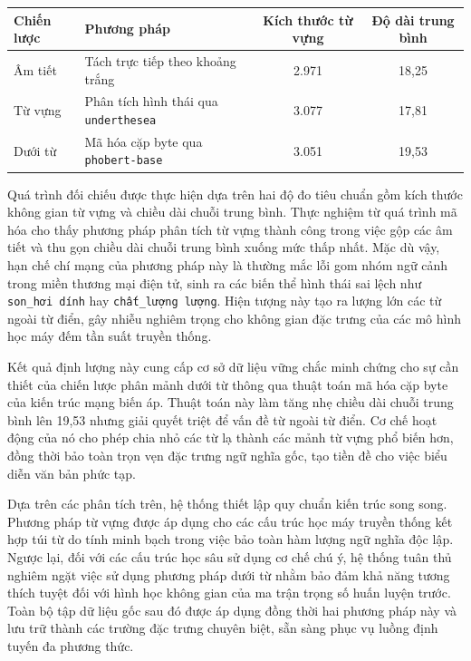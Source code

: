 \begin{center}
\renewcommand{\arraystretch}{1.5}
\noindent\begin{tabularx}{\textwidth}{|>{\raggedright\arraybackslash}p{3.5cm}|>{\raggedright\arraybackslash}X|c|c|}
\hline
\rowcolor[HTML]{E8E8E8}
\textbf{Chiến lược} & \textbf{Phương pháp} & \textbf{Kích thước từ vựng} & \textbf{Độ dài trung bình} \\
\hline
Âm tiết & Tách trực tiếp theo khoảng trắng & 2.971 & 18,25 \\
\hline
Từ vựng & Phân tích hình thái qua \texttt{underthesea} & 3.077 & 17,81 \\
\hline
Dưới từ & Mã hóa cặp byte qua \texttt{phobert-base} & 3.051 & 19,53 \\
\hline
\end{tabularx}
\end{center}

Quá trình đối chiếu được thực hiện dựa trên hai độ đo tiêu chuẩn gồm kích thước không gian từ vựng và chiều dài chuỗi trung bình. Thực nghiệm từ quá trình mã hóa cho thấy phương pháp phân tích từ vựng thành công trong việc gộp các âm tiết và thu gọn chiều dài chuỗi trung bình xuống mức thấp nhất. Mặc dù vậy, hạn chế chí mạng của phương pháp này là thường mắc lỗi gom nhóm ngữ cảnh trong miền thương mại điện tử, sinh ra các biến thể hình thái sai lệch như \texttt{son\_hơi dính} hay \texttt{chất\_lượng lượng}. Hiện tượng này tạo ra lượng lớn các từ ngoài từ điển, gây nhiễu nghiêm trọng cho không gian đặc trưng của các mô hình học máy đếm tần suất truyền thống.

Kết quả định lượng này cung cấp cơ sở dữ liệu vững chắc minh chứng cho sự cần thiết của chiến lược phân mảnh dưới từ thông qua thuật toán mã hóa cặp byte của kiến trúc mạng biến áp. Thuật toán này làm tăng nhẹ chiều dài chuỗi trung bình lên 19,53 nhưng giải quyết triệt để vấn đề từ ngoài từ điển. Cơ chế hoạt động của nó cho phép chia nhỏ các từ lạ thành các mảnh từ vựng phổ biến hơn, đồng thời bảo toàn trọn vẹn đặc trưng ngữ nghĩa gốc, tạo tiền đề cho việc biểu diễn văn bản phức tạp.

Dựa trên các phân tích trên, hệ thống thiết lập quy chuẩn kiến trúc song song. Phương pháp từ vựng được áp dụng cho các cấu trúc học máy truyền thống kết hợp túi từ do tính minh bạch trong việc bảo toàn hàm lượng ngữ nghĩa độc lập. Ngược lại, đối với các cấu trúc học sâu sử dụng cơ chế chú ý, hệ thống tuân thủ nghiêm ngặt việc sử dụng phương pháp dưới từ nhằm bảo đảm khả năng tương thích tuyệt đối với hình học không gian của ma trận trọng số huấn luyện trước. Toàn bộ tập dữ liệu gốc sau đó được áp dụng đồng thời hai phương pháp này và lưu trữ thành các trường đặc trưng chuyên biệt, sẵn sàng phục vụ luồng định tuyến đa phương thức.


